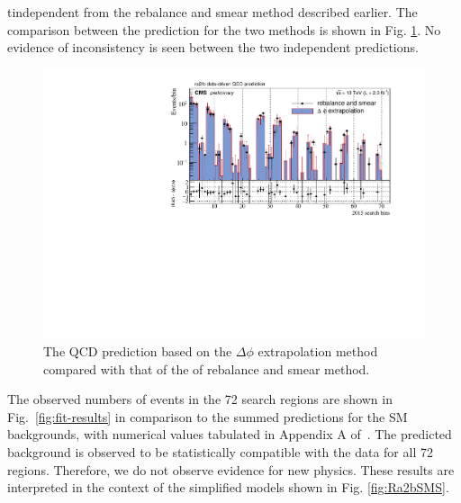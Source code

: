tindependent from the rebalance and smear method described earlier. 
The comparison between the prediction for the two methods is shown in Fig. \ref{fig:2015CompareQCD}. No evidence of inconsistency is seen between the two independent predictions.
\begin{figure}[tb!]
\centering
\includegraphics[width=\linewidth]{figures/SusySearches/Ra2b2015/2015CompareQCD.pdf}
\caption{
  The QCD prediction based on the $\Delta\phi$ extrapolation method compared with that of the of rebalance and smear method.}
\label{fig:2015CompareQCD}
\end{figure}



The observed numbers of events in the 72 search regions
are shown in Fig.~\ref{fig:fit-results}
in comparison to the summed predictions for the SM backgrounds,
with numerical values tabulated in Appendix A of~\cite{Khachatryan:2016kdk}. The predicted background is observed to be statistically compatible
with the data for all 72 regions.
Therefore, we do not observe evidence for new physics.
These results are interpreted in the context of the simplified models shown in Fig. \ref{fig:Ra2bSMS}.

